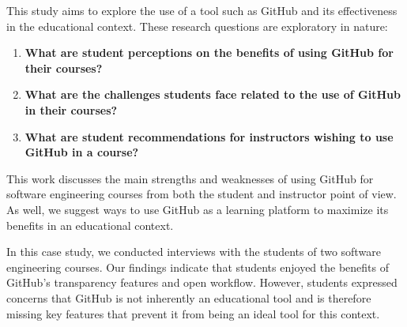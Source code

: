 
This study aims to explore the use of a tool such as GitHub and its effectiveness in the educational context. These research questions are exploratory in nature:
\begin{enumerate}
\item \textbf{What are student perceptions on the benefits of using GitHub for their courses?}
\item \textbf{What are the challenges students face related to the use of GitHub in their courses?}
\item \textbf{What are student recommendations for instructors wishing to use GitHub in a course?}
\end{enumerate}

This work discusses the main strengths and weaknesses of using GitHub for software engineering courses from both the student and instructor point of view. As well, we suggest ways to use GitHub as a learning platform to maximize its benefits in an educational context.

In this case study, we conducted interviews with the students of two software engineering courses. Our findings indicate that students enjoyed the benefits of GitHub's transparency features and open workflow. However, students expressed concerns that GitHub is not inherently an educational tool and is therefore missing key features that prevent it from being an ideal tool for this context.



